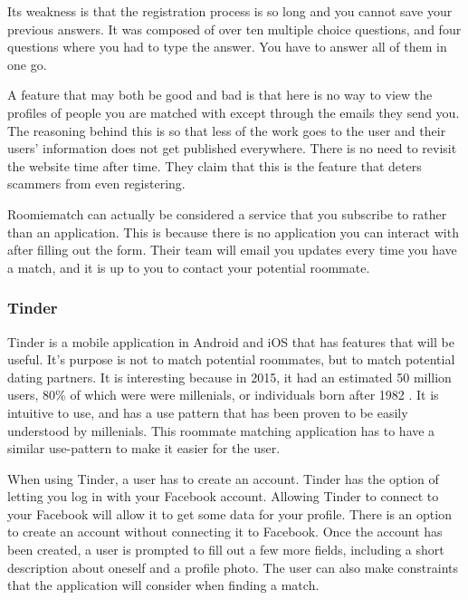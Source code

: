\documentclass[journal]{./IEEE/IEEEtran}
\begin{document}
        Its weakness is that the registration process is so long and you cannot save your previous answers. It was composed of
        over ten multiple choice questions, and four questions where you had to type the answer. You have to answer all of them
        in one go.

        A feature that may both be good and bad is that here is no way to view the profiles of people you are matched with
        except through the emails they send you. The reasoning behind this is so that less of the work goes to the user and
        their users' information does not get published everywhere. There is no need to revisit the website time after time.
        They claim that this is the feature that deters scammers from even registering.

        Roomiematch can actually be considered a service that you subscribe to rather than an application. This is because there
        is no application you can interact with after filling out the form. Their team will email you updates every time you
        have a match, and it is up to you to contact your potential roommate. 

        \subsubsection{Tinder}
        Tinder is a mobile application in Android and iOS that has features that will be useful. It's purpose is not to match
        potential roommates, but to match potential dating partners. It is interesting because in 2015, it had an estimated 50
        million users\cite{tinderstat2}, 80\% of which were were millenials, or individuals born after 1982
        \cite{tinderstat}\cite{millenial}. It is intuitive to use, and has a use pattern that has been proven to be easily
        understood by millenials. This roommate matching application has to have a similar use-pattern to make it easier for the
        user. 

        When using Tinder, a user has to create an account. Tinder has the option of letting you log in with your Facebook
        account. Allowing Tinder to connect to your Facebook will allow it to get some data for your profile. There is an option
        to create an account without connecting it to Facebook. Once the account has been created, a user is prompted to fill
        out a few more fields, including a short description about oneself and a profile photo. The user can also make
        constraints that the application will consider when finding a match.
\end{document}
